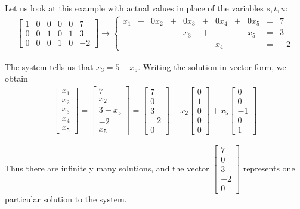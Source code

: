 \documentclass[11pt]{article}
\begin{document}
Let us look at this example with actual values in place of the variables $s,t,u$:
\begin{align*}
\left[
\begin{matrix}
1 & 0 & 0 & 0 & 0 & 7
\\
0 & 0 & 1 & 0 & 1 & 3
\\
0 & 0 & 0 & 1 & 0 & -2
\end{matrix}
\right]
\longrightarrow
\left\{
\begin{aligned}
x_1 &+& 0 x_2 &+& 0 x_3 &+& 0 x_4 &+& 0 x_5 &=& 7
\\
&&&&x_3 &+&&& x_5 &=& 3
\\
&&&&&&x_4 && &=& -2
\end{aligned}
\right.
\end{align*}

The system tells us that $x_3 = 5 - x_5$. Writing the solution in vector form, we obtain
\begin{align*}
\begin{bmatrix}
x_1
\\
x_2
\\
x_3
\\
x_4
\\
x_5
\end{bmatrix}
=
\begin{bmatrix}7\\x_2\\3-x_5\\-2\\x_5\end{bmatrix}
=
\begin{bmatrix}7\\0\\3\\-2\\0\end{bmatrix}
+ x_2 \begin{bmatrix}0\\1\\0\\0\\0\end{bmatrix}
+ x_5 \begin{bmatrix}0\\0\\-1\\0\\1\end{bmatrix}
\end{align*}

Thus there are infinitely many solutions, and the vector $\begin{bmatrix}7\\0\\3\\-2\\0\end{bmatrix}$ represents one particular solution to the system.
\end{document}
